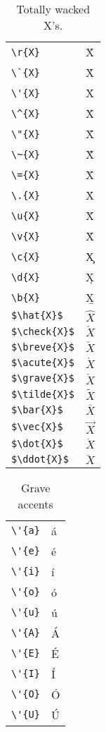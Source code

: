 \documentclass{article}
\begin{document}
\begin{table}
\pagebreak
\begin{center}
\begin{tabular}{ll}
\verb#\r{X}#& \r{X}\\
\verb#\`{X}#& \`{X}\\
\verb#\'{X}#& \'{X}\\
\verb#\^{X}#& \^{X}\\
\verb#\"{X}#& \"{X}\\
\verb#\~{X}#& \~{X}\\
\verb#\={X}#& \={X}\\
\verb#\.{X}#& \.{X}\\
\verb#\u{X}#& \u{X}\\
\verb#\v{X}#& \v{X}\\
\verb#\c{X}#& \c{X}\\
\verb#\d{X}#& \d{X}\\
\verb#\b{X}#& \b{X}\\
\verb#$\hat{X}$#& $\hat{X}$\\
\verb#$\check{X}$#& $\check{X}$\\
\verb#$\breve{X}$#& $\breve{X}$\\
\verb#$\acute{X}$#& $\acute{X}$\\
\verb#$\grave{X}$#& $\grave{X}$\\
\verb#$\tilde{X}$#& $\tilde{X}$\\
\verb#$\bar{X}$#& $\bar{X}$\\
\verb#$\vec{X}$#& $\vec{X}$\\
\verb#$\dot{X}$#& $\dot{X}$\\
\verb#$\ddot{X}$#& $\ddot{X}$\\
\end{tabular}
\caption{Totally wacked X's.}
\end{center}
\end{table}
\pagebreak

\begin{table}
\begin{center}
\begin{tabular}{ll}
\verb#\'{a}#& \'{a}\\
\verb#\'{e}#& \'{e}\\
\verb#\'{i}#& \'{i}\\
\verb#\'{o}#& \'{o}\\
\verb#\'{u}#& \'{u}\\
\verb#\'{A}#& \'{A}\\
\verb#\'{E}#& \'{E}\\
\verb#\'{I}#& \'{I}\\
\verb#\'{O}#& \'{O}\\
\verb#\'{U}#& \'{U}\\
\end{tabular}
\caption{Grave accents}
\end{center}
\end{table}
\end{document}
